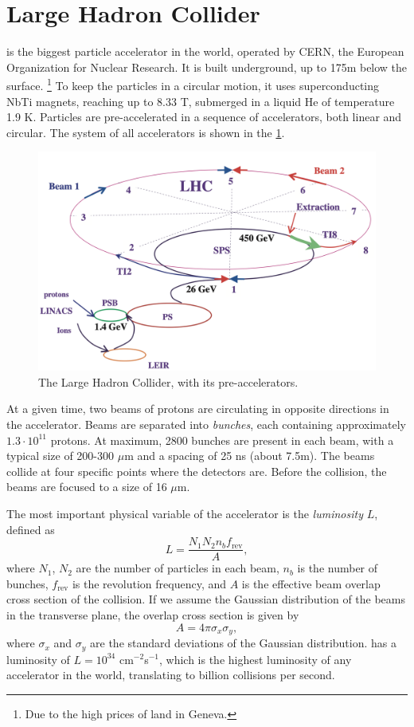 \section{Large Hadron Collider}
\label{sec:lhc}
\LHC is the biggest particle accelerator in the world, operated by CERN, the European Organization for Nuclear Research.
It is built underground, up to 175m below the surface. \footnote{Due to the high prices of land in Geneva.}
To keep the particles in a circular motion, it uses superconducting NbTi magnets, reaching up to 8.33 T, submerged in a liquid He of temperature 1.9 K.
Particles are pre-accelerated in a sequence of accelerators, both linear and circular.
The system of all accelerators is shown in the \cref{fig:lhc}.
\begin{figure}[htb]
    \centering
    \includegraphics[width=0.9\linewidth]{src/img/LHC.png}
    \caption{The Large Hadron Collider, with its pre-accelerators.}
    \label{fig:lhc}
\end{figure}


At a given time, two beams of protons are circulating in opposite directions in the accelerator.
Beams are separated into \emph{bunches}, each containing approximately $1.3\cdot10^{11}$ protons.
At maximum, 2800 bunches are present in each beam, with a typical size of 200-300 $\mu$m and a spacing of 25 ns (about 7.5m).
The beams collide at four specific points where the detectors are.
Before the collision, the beams are focused to a size of 16 $\mu$m.

The most important physical variable of the accelerator is the \emph{luminosity} $L$, defined as 
\begin{equation}
    \label{eq:lumni}
    L = \frac{N_1 N_2 n_b f_{\text{rev}}}{A}, 
\end{equation}
where $N_1$, $N_2$ are the number of particles in each beam, $n_b$ is the number of bunches, $f_{\text{rev}}$ is the revolution frequency, and $A$ is the effective beam overlap cross section of the collision. 
If we assume the Gaussian distribution of the beams in the transverse plane, the overlap cross section is given by 
\begin{equation}
    A = 4 \pi \sigma_x \sigma_y,
\end{equation}
where $\sigma_x$ and $\sigma_y$ are the standard deviations of the Gaussian distribution.
\LHC has a luminosity of $L = 10^{34}$ cm$^{-2}$s$^{-1}$, which is the highest luminosity of any accelerator in the world, translating to billion collisions per second.

